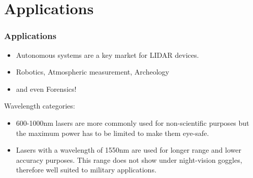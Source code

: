 \documentclass{beamer}
\begin{document}
\section{Applications} 
\begin{frame}
\frametitle{Applications}
\begin{itemize}
\item Autonomous systems are a key market for LIDAR devices.
\item Robotics, Atmospheric measurement, Archeology
\item and even Forensics!
\end{itemize}
Wavelength categories:
\begin{itemize}
\item 600-1000nm lasers are more commonly used for non-scientific purposes but the maximum power has to be limited to make them eye-safe.
\item Lasers with a wavelength of 1550nm are used for longer range and lower accuracy purposes. This range does not show under night-vision goggles, therefore well suited to military applications.
\end{itemize}
\end{frame}
%
\end{document}
